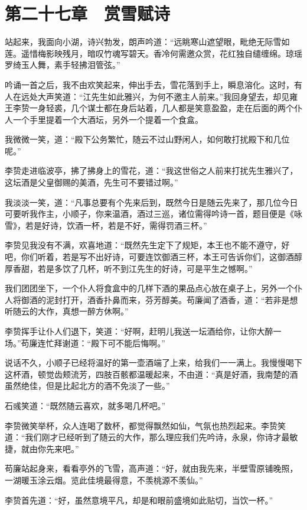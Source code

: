 \chapter{第二十七章　赏雪赋诗}

站起来，我面向小湖，诗兴勃发，朗声吟道：“远眺寒山遮望眼，毗绝无际雪如莲。遥惜梅影映残月，暗叹竹魂写碧天。香冷何需邀众赏，花红独自缱缠绵。琼瑶罗绮玉人舞，素手轻拂泪管弦。”

吟诵一首之后，我不由欢笑起来，伸出手去，雪花落到手上，瞬息溶化。这时，有人在远处大声笑道：“江先生如此雅兴，为何不邀主人前来。”我回身望去，却见雍王李贽一身轻裘，几个谋士都在身后站着，几人都是笑意盈盈，走在后面的两个仆人一个手里提着一个大酒坛，另外一个提着一个食盒。

我微微一笑，道：“殿下公务繁忙，随云不过山野闲人，如何敢打扰殿下和几位呢。”

李贽走进临波亭，拂了拂身上的雪花，道：“我这世俗之人前来打扰先生雅兴了，这坛酒是父皇御赐的美酒，先生可不要错过啊。”

我淡淡一笑，道：“凡事总要有个先来后到，既然今日是随云先来了，那几位今日可要听我作主，小顺子，你来温酒，酒过三巡，诸位需得吟诗一首，题目便是《咏雪》，若是好诗，饮酒一杯，若是不好，需得罚酒三杯。”

李贽见我没有不满，欢喜地道：“既然先生定下了规矩，本王也不能不遵守，好吧，你们听着，若是写不出好诗，可要连饮御酒三杯，本王可告诉你们，这御酒醇厚香甜，若是多饮了几杯，听不到江先生的好诗，可是平生之憾啊。”

我们团团坐下，一个仆人将食盒中的几样下酒的果品点心放在桌子上，另外一个仆人将御酒的泥封打开，酒香扑鼻而来，芬芳醇美。苟廉闻了酒香，道：“若非是想听随云的大作，真想一醉方休啊。”

李贽挥手让仆人们退下，笑道：“好啊，赶明儿我送一坛酒给你，让你大醉一场。”苟廉连忙拜谢道：“殿下可不能后悔啊。”

说话不久，小顺子已经将温好的第一壶酒端了上来，给我们一一满上。我慢慢喝下这杯酒，顿觉齿颊流芳，四肢百骸都温暖起来，不由道：“真是好酒，我南楚的酒虽然绝佳，但是比起北方的酒不免淡了一些。”

石彧笑道：“既然随云喜欢，就多喝几杯吧。”

李贽微笑举杯，众人连喝了数杯，都觉得飘然如仙，气氛也热烈起来。李贽笑道：“我们刚才已经听到了随云的大作，那么理应我们先吟诗，永泉，你诗才最敏捷，就由你先来吧。”

苟廉站起身来，看看亭外的飞雪，高声道：“好，就由我先来，半壁雪原铺晚照，一湖暖玉涂云烟。览此佳境最得意，不羡桃源不羡仙。”

李贽首先道：“好，虽然意境平凡，却是和眼前盛境如此贴切，当饮一杯。”


